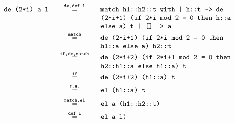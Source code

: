 \begin{itemize}
{        \begin{displaymath}
            \begin{aligned}
                \texttt{de (2*i) a l} 
                &\eq{de,def l}{match h1::h2::t with
                | h::t -> de (2*i+1) (if 2*i mod 2 = 0 then h::a else a) t | [] -> a} \\
                &\eq{match}{de (2*i+1) (if 2*i mod 2 = 0 then h1::a else a) h2::t} \\
                &\eq{if,de,match}{de (2*i+2) (if 2*i+1 mod 2 = 0 then h2::h1::a else h1::a) t} \\
                &\eq{if}{de (2*i+2) (h1::a) t} \\
                &\eq{I.H.}{el (h1::a) t} \\
                &\eq{match,el}{el a (h1::h2::t)} \\
                &\eq{def l}{el a l)} \\
            \end{aligned}
        \end{displaymath}
    }
\end{itemize}